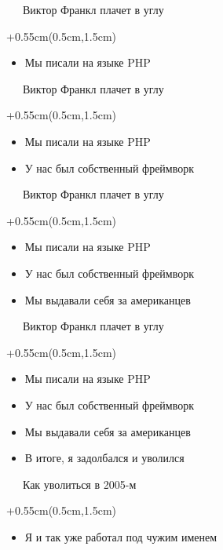 \documentclass[xetex,18pt,aspectratio=169]{beamer}
\begin{document}
\begin{Large}
\begin{frame}{\ \ \ Виктор Франкл плачет в углу}
\begin{textblock*}{\framewidth+0.55cm}(0.5cm,1.5cm)
\begin{itemize}
  \item Мы писали на языке PHP
\end{itemize}
\end{textblock*}
\end{frame}

\begin{frame}{\ \ \ Виктор Франкл плачет в углу}
\begin{textblock*}{\framewidth+0.55cm}(0.5cm,1.5cm)
\begin{itemize}
  \item Мы писали на языке PHP
  \item У нас был собственный фреймворк
\end{itemize}
\end{textblock*}
\end{frame}

\begin{frame}{\ \ \ Виктор Франкл плачет в углу}
\begin{textblock*}{\framewidth+0.55cm}(0.5cm,1.5cm)
\begin{itemize}
  \item Мы писали на языке PHP
  \item У нас был собственный фреймворк
  \item Мы выдавали себя за американцев
\end{itemize}
\end{textblock*}
\end{frame}

\begin{frame}{\ \ \ Виктор Франкл плачет в углу}
\begin{textblock*}{\framewidth+0.55cm}(0.5cm,1.5cm)
\begin{itemize}
  \item Мы писали на языке PHP
  \item У нас был собственный фреймворк
  \item Мы выдавали себя за американцев
  \item В итоге, я задолбался и уволился
\end{itemize}
\end{textblock*}
\end{frame}

\begin{frame}{\ \ \ Как уволиться в 2005-м}
\begin{textblock*}{\framewidth+0.55cm}(0.5cm,1.5cm)
\begin{itemize}
  \item Я и так уже работал под чужим именем
\end{itemize}
\end{textblock*}
\end{frame}


\end{Large}
\end{document}
